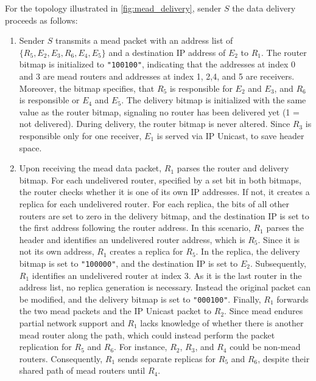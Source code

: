 For the topology illustrated in \autoref{fig:mead_delivery}, sender $S$ the
    data delivery proceeds as follows:

\begin{enumerate}[label={(\arabic*)}]

\item
Sender $S$ transmits a \gls{mead} packet with an address list of
    $\{R_5,E_2,E_3,R_6,E_4,E_5\}$ and a destination IP address of $E_2$ to
    $R_1$.
The router bitmap is initialized to \texttt{"100100"}, indicating that the
    addresses at index 0 and 3 are \gls{mead} routers and addresses at index 1,
    2,4, and 5 are receivers.
Moreover, the bitmap specifies, that $R_5$ is responsible for $E_2$ and $E_3$,
    and $R_6$ is responsible or $E_4$ and $E_5$.
The delivery bitmap is initialized with the same value as the router bitmap,
    signaling no router has been delivered yet (1 = not delivered).
During delivery, the router bitmap is never altered.
Since $R_3$ is responsible only for one receiver, $E_1$ is served via IP
    Unicast, to save header space.

\item
Upon receiving the \gls{mead} data packet, $R_1$ parses the router and delivery
    bitmap.
For each undelivered router, specified by a set bit in both bitmaps, the router
    checks whether it is one of its own IP addresses.
If not, it creates a replica for each undelivered router.
For each replica, the bits of all other routers are set to zero in the delivery
    bitmap, and the destination IP is set to the first address following the
    router address.
In this scenario, $R_1$ parses the header and identifies an undelivered router
    address, which is $R_5$.
Since it is not its own address, $R_1$ creates a replica for $R_5$.
In the replica, the delivery bitmap is set to \texttt{"100000"}, and the
    destination IP is set to $E_2$.
Subsequently, $R_1$ identifies an undelivered router at index 3.
As it is the last router in the address list, no replica generation is
    necessary.
Instead the original packet can be modified, and the delivery bitmap is set to
    \texttt{"000100"}.
Finally, $R_1$ forwards the two \gls{mead} packets and the IP Unicast packet to
    $R_2$.
Since \gls{mead} endures partial network support and $R_1$ lacks knowledge of
    whether there is another \gls{mead} router along the path, which could
    instead perform the packet replication for $R_5$ and $R_6$.
For instance, $R_2$, $R_3$, and $R_4$ could be non-\gls{mead} routers.
Consequently, $R_1$ sends separate replicas for $R_5$ and $R_6$, despite their
    shared path of \gls{mead} routers until $R_4$.


\end{enumerate}
